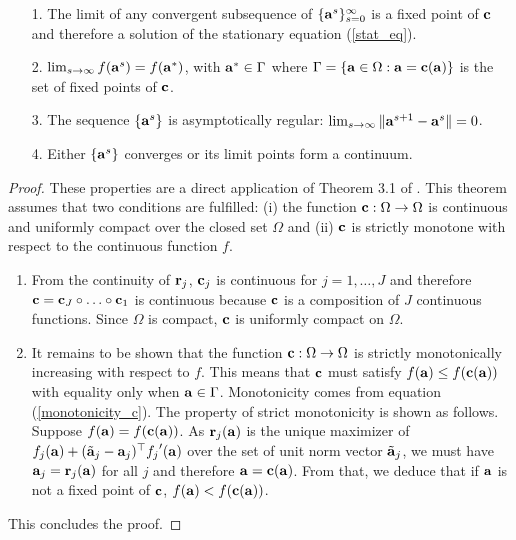 \documentclass[
]{jss}
\begin{document}
\begin{enumerate}
\item [1.]  The limit of any convergent subsequence of 
$\{\mathbf{a}^s\}_{s=0}^{\infty}$ is a fixed point of $\mathbf{c}$ and therefore a 
solution of the stationary equation (\ref{stat_eq}).

\item [2.] $\lim_{s \rightarrow \infty}f(\mathbf{a}^{s}) = f(\mathbf{a}^{*})$, with 
$\mathbf{a}^{*} \in \Gamma$ where $\Gamma = \{\mathbf{a} \in \Omega: \mathbf{a} = \mathbf{c}(\mathbf{a})\}$ is the set of fixed points of $\mathbf{c}$.

\item [3.]      The sequence $\{\mathbf{a}^s\}$ is asymptotically regular: 
$ \lim_{s \rightarrow\infty} \Vert \mathbf{a}^{s+1}- \mathbf{a}^{s}\Vert =  0$.

\item [4.]      Either $\{\mathbf{a}^s\}$ converges or its
limit points form a continuum.
\end{enumerate}

\begin{proof}[Proof]
These properties are a direct application of Theorem 3.1 of \cite[p. 
110]{Meyer1976}. This theorem assumes that two conditions are fulfilled: (i) the 
function $\mathbf{c}:\Omega \rightarrow \Omega$ is continuous and uniformly compact 
over the closed set $\Omega$ and (ii) $\mathbf{c}$ is strictly monotone with respect 
to the continuous function $f$.

\begin{enumerate}[label=(\roman*)]
\item  From the continuity of $\mathbf{r}_j$, $\mathbf{c}_j$ is continuous for $j = 
1, \ldots, J$ and therefore $\mathbf{c} = \mathbf{c}_J \circ \ldots \circ \mathbf{c}_1$ is 
continuous because $\mathbf{c}$ is a composition of $J$ continuous functions. Since 
$\Omega$ is compact, $\mathbf{c}$ is uniformly compact on $\Omega$.\\

\item It remains to be shown that the function $\mathbf{c} : \Omega \rightarrow 
\Omega$ is strictly monotonically increasing with respect to $f$. This means 
that $\mathbf{c}$ must satisfy $f(\mathbf{a}) \leq f(\mathbf{c}(\mathbf{a}))$ with equality only 
when $\mathbf{a} \in \Gamma$. Monotonicity comes from equation 
(\ref{monotonicity_c}). The property of strict monotonicity is shown as follows. 
Suppose $f(\mathbf{a}) = f(\mathbf{c}(\mathbf{a}))$. As $\mathbf{r}_j(\mathbf{a})$ is the unique 
maximizer of $f_j(\mathbf{a}) + (\tilde {\mathbf{a}}_j-\mathbf{a}_j)^\top {f_{j}}'(\mathbf{a})$ 
over the set of unit norm vector $\tilde{\mathbf{a}}_j$, we must have $\mathbf{a}_j = \mathbf{r}_j(\mathbf{a})$ for all $j$ and therefore $\mathbf{a} = \mathbf{c}(\mathbf{a})$. From that, we 
deduce that if $\mathbf{a}$ is not a fixed point of $\mathbf{c}$, $f(\mathbf{a}) < f(\mathbf{c}(\mathbf{a}))$.
\end{enumerate}
This concludes the proof.
\end{proof}
\end{document}
